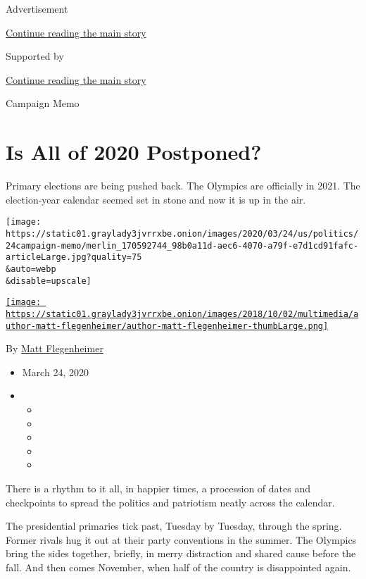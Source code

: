 Advertisement

\protect\hyperlink{after-top}{Continue reading the main story}

Supported by

\protect\hyperlink{after-sponsor}{Continue reading the main story}

Campaign Memo

\hypertarget{is-all-of-2020-postponed}{%
\section{Is All of 2020 Postponed?}\label{is-all-of-2020-postponed}}

Primary elections are being pushed back. The Olympics are officially in
2021. The election-year calendar seemed set in stone and now it is up in
the air.

\texttt{[image: https://static01.graylady3jvrrxbe.onion/images/2020/03/24/us/politics/24campaign-memo/merlin\_170592744\_98b0a11d-aec6-4070-a79f-e7d1cd91fafc-articleLarge.jpg?quality=75\\\&auto=webp\\\&disable=upscale]}

\href{https://www.nytimes3xbfgragh.onion/by/matt-flegenheimer}{\texttt{[image: https://static01.graylady3jvrrxbe.onion/images/2018/10/02/multimedia/author-matt-flegenheimer/author-matt-flegenheimer-thumbLarge.png]}}

By \href{https://www.nytimes3xbfgragh.onion/by/matt-flegenheimer}{Matt
Flegenheimer}

\begin{itemize}
\item
  March 24, 2020
\item
  \begin{itemize}
  \item
  \item
  \item
  \item
  \item
  \end{itemize}
\end{itemize}

There is a rhythm to it all, in happier times, a procession of dates and
checkpoints to spread the politics and patriotism neatly across the
calendar.

The presidential primaries tick past, Tuesday by Tuesday, through the
spring. Former rivals hug it out at their party conventions in the
summer. The Olympics bring the sides together, briefly, in merry
distraction and shared cause before the fall. And then comes November,
when half of the country is disappointed again.

